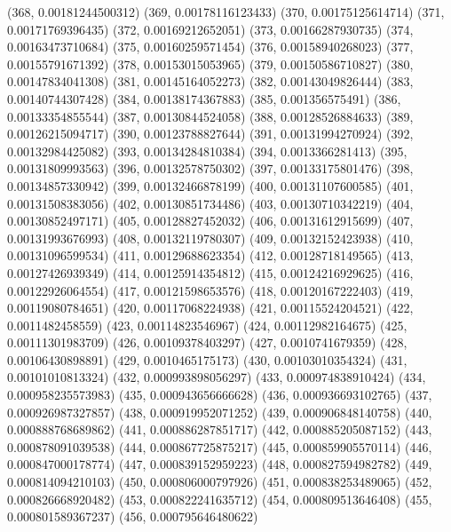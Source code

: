 {					(368, 0.00181244500312)
					(369, 0.00178116123433)
					(370, 0.00175125614714)
					(371, 0.00171769396435)
					(372, 0.00169212652051)
					(373, 0.00166287930735)
					(374, 0.00163473710684)
					(375, 0.00160259571454)
					(376, 0.00158940268023)
					(377, 0.00155791671392)
					(378, 0.00153015053965)
					(379, 0.00150586710827)
					(380, 0.00147834041308)
					(381, 0.00145164052273)
					(382, 0.00143049826444)
					(383, 0.00140744307428)
					(384, 0.00138174367883)
					(385, 0.001356575491)
					(386, 0.00133354855544)
					(387, 0.00130844524058)
					(388, 0.00128526884633)
					(389, 0.00126215094717)
					(390, 0.00123788827644)
					(391, 0.00131994270924)
					(392, 0.00132984425082)
					(393, 0.00134284810384)
					(394, 0.0013366281413)
					(395, 0.00131809993563)
					(396, 0.00132578750302)
					(397, 0.00133175801476)
					(398, 0.00134857330942)
					(399, 0.00132466878199)
					(400, 0.00131107600585)
					(401, 0.00131508383056)
					(402, 0.00130851734486)
					(403, 0.00130710342219)
					(404, 0.00130852497171)
					(405, 0.00128827452032)
					(406, 0.00131612915699)
					(407, 0.00131993676993)
					(408, 0.00132119780307)
					(409, 0.00132152423938)
					(410, 0.00131096599534)
					(411, 0.00129688623354)
					(412, 0.00128718149565)
					(413, 0.00127426939349)
					(414, 0.00125914354812)
					(415, 0.00124216929625)
					(416, 0.00122926064554)
					(417, 0.00121598653576)
					(418, 0.00120167222403)
					(419, 0.00119080784651)
					(420, 0.00117068224938)
					(421, 0.00115524204521)
					(422, 0.0011482458559)
					(423, 0.00114823546967)
					(424, 0.00112982164675)
					(425, 0.00111301983709)
					(426, 0.00109378403297)
					(427, 0.0010741679359)
					(428, 0.00106430898891)
					(429, 0.0010465175173)
					(430, 0.00103010354324)
					(431, 0.00101010813324)
					(432, 0.000993898056297)
					(433, 0.000974838910424)
					(434, 0.000958235573983)
					(435, 0.000943656666628)
					(436, 0.000936693102765)
					(437, 0.000926987327857)
					(438, 0.000919952071252)
					(439, 0.000906848140758)
					(440, 0.000888768689862)
					(441, 0.000886287851717)
					(442, 0.000885205087152)
					(443, 0.000878091039538)
					(444, 0.000867725875217)
					(445, 0.000859905570114)
					(446, 0.000847000178774)
					(447, 0.000839152959223)
					(448, 0.000827594982782)
					(449, 0.000814094210103)
					(450, 0.000806000797926)
					(451, 0.000838253489065)
					(452, 0.000826668920482)
					(453, 0.000822241635712)
					(454, 0.000809513646408)
					(455, 0.000801589367237)
					(456, 0.000795646480622)
}
